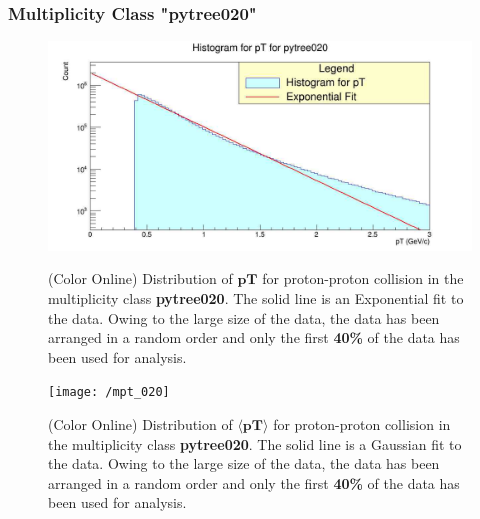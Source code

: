 \documentclass[letterpaper,aps,prc,superscriptaddress,nofootinbib,10pt,showpacs,floatfix]{revtex4-2}
\begin{document}
\subsubsection{Multiplicity Class "pytree020"}
\label{subsubsec:020}
\vspace{-5mm}
\begin{figure}[!htb]
   \begin{minipage}{0.48\textwidth}
   \label{Fig:1a}
   \label{Fig:1b}
     \centering
     \renewcommand{\thefigure}{1a}
     \includegraphics[width=1.1\linewidth]{pt_020}
     \caption{(Color Online) Distribution of $\mathbf{pT}$ for proton-proton collision in the multiplicity class \textbf{pytree020}. The solid line is an Exponential fit to the data. Owing to the large size of the data, the data has been arranged in a random order and only the first \textbf{40\%} of the data has been used for analysis.}
   \end{minipage}\hfill
   \begin{minipage}{0.48\textwidth}
     \centering
     \renewcommand{\thefigure}{1b}
     \texttt{[image: /mpt\_020]}
     \caption{(Color Online) Distribution of $\mathbf{\langle pT\rangle }$ for proton-proton collision in the multiplicity class \textbf{pytree020}. The solid line is a Gaussian fit to the data. Owing to the large size of the data, the data has been arranged in a random order and only the first \textbf{40\%} of the data has been used for analysis.}
   \end{minipage}
\end{figure}

\FloatBarrier
\vspace{-3mm}
\pagebreak
\end{document}
